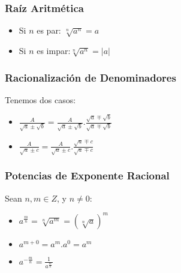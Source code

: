     \subsubsection{Raíz Aritmética}
    \begin{itemize}
     \item Si $n$ es par: $ \sqrt[n]{a^n} = a$
     \item Si $n$ es impar:$ \sqrt[n]{a^n} = |a|$
    \end{itemize}

    \subsubsection{Racionalización de Denominadores}
    Tenemos dos casos:
    \begin{itemize}
     \item $\frac{A}{ \sqrt{a} \pm \sqrt{b}} = \frac{A}{ \sqrt{a} \pm \sqrt{b}} . \frac{\sqrt{a} \mp \sqrt{b}}{\sqrt{a} \mp \sqrt{b}}$
     \item $\frac{A}{ \sqrt{a} \pm c} = \frac{A}{ \sqrt{a} \pm c} . \frac{\sqrt{a} \mp c}{\sqrt{a} \mp c}$
    \end{itemize}
    
    \subsubsection{Potencias de Exponente Racional}
    Sean $n,m \in Z$, y $n \neq 0$: \newline
    \begin{itemize}
     \item  $a^{\frac{m}{n}}= \sqrt[n]{a^{m}}= (\sqrt[n]{a})^m $
     \item $a^{m+0}=a^m.a^0=a^m$
     \item  $a^{-\frac{m}{n}}= \frac{1}{a^{\frac{m}{n}}}$
    \end{itemize}
  